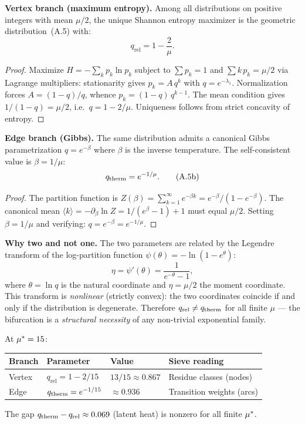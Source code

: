 \documentclass[12pt,a4paper]{article}
\providecommand{\qrel}{\ensuremath{q_{\mathrm{rel}}}}
\begin{document}
\begin{theorembox}

\textbf{Vertex branch (maximum entropy).}
Among all distributions on positive integers with mean $\mu/2$, the
unique Shannon entropy maximizer is the geometric distribution~(A.5)
with:
\begin{equation}
  \qrel = 1 - \frac{2}{\mu}.
  \tag{A.5a}
\end{equation}

\begin{proof}
Maximize $H = -\sum_k p_k \ln p_k$ subject to $\sum p_k = 1$ and
$\sum k\,p_k = \mu/2$ via Lagrange multipliers: stationarity gives
$p_k = A\,q^k$ with $q = e^{-\lambda_1}$. Normalization forces
$A = (1-q)/q$, whence $p_k = (1-q)\,q^{k-1}$. The mean condition
gives $1/(1-q) = \mu/2$, i.e.\ $q = 1 - 2/\mu$. Uniqueness follows
from strict concavity of entropy.
\end{proof}

\textbf{Edge branch (Gibbs).}
The same distribution admits a canonical Gibbs parametrization
$q = e^{-\beta}$ where $\beta$ is the inverse temperature. The
self-consistent value is $\beta = 1/\mu$:
\begin{equation}
  q_{\mathrm{therm}} = e^{-1/\mu}.
  \tag{A.5b}
\end{equation}

\begin{proof}
The partition function is
$Z(\beta) = \sum_{k=1}^{\infty} e^{-\beta k} = e^{-\beta}/(1-e^{-\beta})$.
The canonical mean $\langle k \rangle = -\partial_\beta \ln Z = 1/(e^\beta - 1) + 1$
must equal $\mu/2$. Setting $\beta = 1/\mu$ and verifying:
$q = e^{-\beta} = e^{-1/\mu}$.
\end{proof}

\textbf{Why two and not one.}
The two parameters are related by the Legendre transform of the
log-partition function $\psi(\theta) = -\ln(1-e^\theta)$:
\[
  \eta = \psi'(\theta) = \frac{1}{e^{-\theta} - 1},
\]
where $\theta = \ln q$ is the natural coordinate and $\eta = \mu/2$
the moment coordinate. This transform is \emph{nonlinear} (strictly
convex): the two coordinates coincide if and only if the distribution
is degenerate. Therefore $\qrel \neq \qtherm$ for all finite
$\mu$ --- the bifurcation is a \emph{structural necessity} of any
non-trivial exponential family.
\end{theorembox}

At ${\mu^{*}} = 15$:
\begin{center}
\begin{tabular}{llll}
\toprule
\textbf{Branch} & \textbf{Parameter} & \textbf{Value} & \textbf{Sieve reading} \\
\midrule
Vertex & $\qrel = 1 - 2/15$ & $13/15 \approx 0.867$ & Residue classes (nodes) \\
Edge & $q_{\mathrm{therm}} = e^{-1/15}$ & $\approx 0.936$ & Transition weights (arcs) \\
\bottomrule
\end{tabular}
\end{center}
The gap $\qtherm - \qrel \approx 0.069$ (latent heat) is nonzero for
all finite ${\mu^{*}}$.
\end{document}

